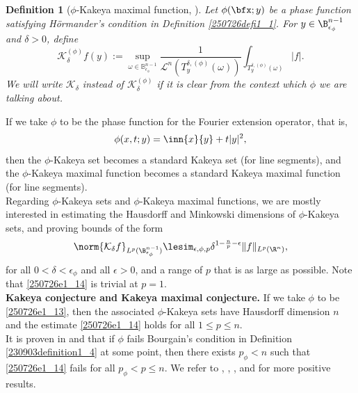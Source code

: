 \documentclass{article}
\numberwithin{equation}{section}
\theoremstyle{plain}
\newtheorem{definition}[theorem]{Definition}
\begin{document}
\begin{definition}[$\phi$-Kakeya maximal function, \cite{Bou91}] Let $\phi(\bfx; y)$ be a phase function satisfying H\"ormander's condition in Definition \ref{250726defi1_1}. For $y\in \B^{n-1}_{\epsilon_{\phi}}$ and $\delta>0$, define 
\begin{equation}
\mathcal{K}_\delta^{(\phi)} f(y):=\sup _{\omega \in \mathbb{B}_{\epsilon_\phi}^{n-1}} \frac{1}{\mathcal{L}^n\left(T_y^{\delta,(\phi)}(\omega)\right)} \int_{T_y^{\delta,(\phi)}(\omega)}|f| .
\end{equation}
We will write $\mathcal{K}_\delta$ instead of $\mathcal{K}_\delta^{(\phi)}$ if it is clear from the context which $\phi$ we are talking about. 
\end{definition}


If we take $\phi$ to be the phase function for the Fourier extension operator, that is, 
\begin{equation}\label{250726e1_13}
\phi(x, t; y)= \inn{x}{y}+ t|y|^2,
\end{equation}
then the $\phi$-Kakeya set becomes a standard Kakeya set (for line segments), and the $\phi$-Kakeya maximal function becomes a standard Kakeya maximal function (for line segments). \\



Regarding $\phi$-Kakeya sets and $\phi$-Kakeya maximal functions, we are mostly interested in estimating the Hausdorff and Minkowski dimensions of $\phi$-Kakeya sets, and proving bounds of the form 
\begin{equation}\label{250726e1_14}
\norm{
\mathcal{K}_{\delta} f
}_{L^p(
\B^{n-1}_{\epsilon_{\phi}}
)}
\lesim_{\epsilon, \phi, p}
\delta^{1-\frac{n}{p}-\epsilon} \|f\|_{L^p(\R^n)},
\end{equation}
for all $0<\delta< \epsilon_{\phi}$ and all $\epsilon>0$, and a range of $p$ that is as large as possible. Note that \eqref{250726e1_14} is trivial at $p=1$. \\

{\bf Kakeya conjecture and Kakeya maximal conjecture.} If we take $\phi$ to be \eqref{250726e1_13}, then the associated $\phi$-Kakeya sets have Hausdorff dimension $n$ and 
 the estimate \eqref{250726e1_14} holds for all $1\le p\le n$. \\






It is proven in \cite{Bou91} and \cite{GWZ24} that if $\phi$ fails Bourgain's condition in Definition \ref{230903definition1_4} at some point, then there exists $p_{\phi}< n$ such that \eqref{250726e1_14} fails for all $p_{\phi}< p\le n$. We refer to \cite{HRZ22}, \cite{GWZ24}, \cite{DGGZ24}, \cite{CGGHIW24} and \cite{nadjimzadah2025newcurvedkakeyaestimates} for more positive results. 
\end{document}
